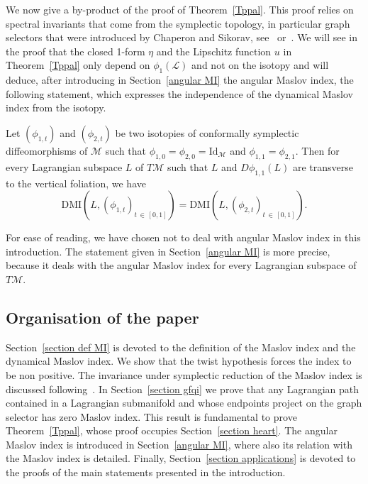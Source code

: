 \documentclass[AHL, Unicode, longabstracts, published]{cedram}
\newcommand*\M{\mathcal{M}}
\newcommand*\cl{\mathcal{L}}
\newcommand{\rId}{\mathrm{Id}}
\newcommand{\DMI}{\mathrm{DMI}}
\begin{document}
We now give a by-product of the proof of Theorem~\ref{Tppal}. This proof relies on spectral invariants that come from the symplectic topology, in particular graph selectors that were introduced by Chaperon and Sikorav, see~\cite{Chap1991,OttVit94} or~\cite{PPS2003}. We will see in the proof that the closed 1-form $\eta$ and the Lipschitz function $u$ in Theorem~\ref{Tppal} only depend on $\phi_1(\cl)$ and not on the isotopy and will deduce, after introducing in Section~\ref{angular MI} the angular Maslov index, the following statement, which expresses the independence of the dynamical Maslov index from the isotopy.

\begin{prop}\label{Indisotopybis}
Let $(\phi_{1, t})$ and $(\phi_{2, t})$ be two isotopies of conformally symplectic diffeomorphisms of $\M$ such that $\phi_{1, 0}=\phi_{2, 0}=\rId_\M$ and $\phi_{1, 1}=\phi_{2, 1}$. Then for every Lagrangian subspace $L$ of $T\M$ such that $L$ and $D\phi_{1, 1}(L)$ are transverse to the vertical foliation, we have
\[
\DMI\left(L, (\phi_{1, t})_{t\,\in\,[0, 1]}\right)= \DMI\left(L, (\phi_{2, t})_{t\,\in\,[0, 1]}\right).
\]
\end{prop}

\begin{rema}
For ease of reading, we have chosen not to deal with angular Maslov index in this introduction.
The statement given in Section~\ref{angular MI} is more precise, because it deals with the angular Maslov index for every Lagrangian subspace of $T\M$.
\end{rema}

\subsection*{Organisation of the paper}

Section~\ref{section def MI} is devoted to the definition of the Maslov index and the dynamical Maslov index. We show that the twist hypothesis forces the index to be non positive. The invariance under symplectic reduction of the Maslov index is discussed following~\cite{Vit1987}. In Section~\ref{section gfqi} we prove that any Lagrangian path contained in a Lagrangian submanifold and whose endpoints project on the graph selector has zero Maslov index. This result is fundamental to prove Theorem~\ref{Tppal}, whose proof occupies Section~\ref{section heart}. The angular Maslov index is introduced in Section~\ref{angular MI}, where also its relation with the Maslov index is detailed. Finally, Section~\ref{section applications} is devoted to the proofs of the main statements presented in the introduction.
\end{document}
